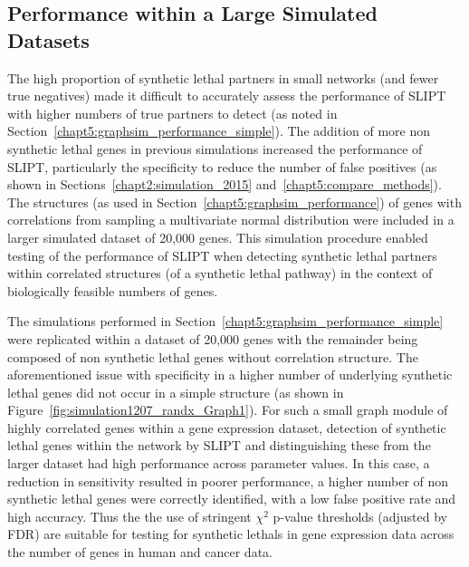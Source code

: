 \FloatBarrier

\subsection{Performance within a Large Simulated Datasets}
\label{chapt5:graphsim_performance_20K}

\FloatBarrier


The high proportion of \gls{synthetic lethal} partners in small networks (and fewer true negatives) made it difficult to accurately assess the performance of \gls{SLIPT} with higher numbers of true partners to detect (as noted in Section~\ref{chapt5:graphsim_performance_simple}). The addition of more non synthetic lethal genes in previous simulations increased the performance of \gls{SLIPT}, particularly the specificity to reduce the number of false positives (as shown in Sections~\ref{chapt2:simulation_2015} and~\ref{chapt5:compare_methods}). The  structures (as used in Section~\ref{chapt5:graphsim_performance}) of genes with correlations from sampling a multivariate normal distribution were included in a larger simulated dataset of 20,000 genes. This simulation procedure enabled testing of the performance of \gls{SLIPT} when detecting \gls{synthetic lethal} partners within correlated  structures (of a \gls{synthetic lethal} pathway) in the context of biologically feasible numbers of genes. 



The simulations performed in Section~\ref{chapt5:graphsim_performance_simple} were replicated within a dataset of 20,000 genes with the remainder being composed of non synthetic lethal genes without correlation structure. The aforementioned issue with specificity in a higher number of underlying \gls{synthetic lethal} genes did not occur in a simple  structure (as shown in Figure~\ref{fig:simulation1207_randx_Graph1}). For such a small graph module of highly correlated genes within a \gls{gene expression} dataset, detection of \gls{synthetic lethal} genes within the network by \gls{SLIPT} and distinguishing these from the larger dataset had high performance across parameter values. In this case, a reduction in sensitivity resulted in poorer performance, a higher number of non synthetic lethal genes were correctly identified, with a low false positive rate and high accuracy. Thus the the use of stringent $\chi^2$ p-value thresholds (adjusted by \gls{FDR}) are suitable for testing for \glspl{synthetic lethal} in \gls{gene expression} data across the number of genes in human and cancer data.

